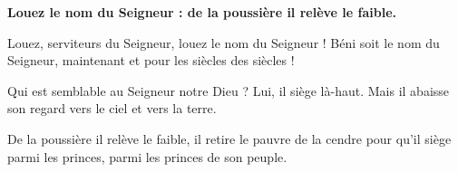 \textbf{Louez le nom du Seigneur :
de la poussière il relève le faible.}

\smallskip

Louez, serviteurs du Seigneur,
louez le nom du Seigneur !
Béni soit le nom du Seigneur,
maintenant et pour les siècles des siècles !

\smallskip

Qui est semblable au Seigneur notre Dieu ?
Lui, il siège là-haut.
Mais il abaisse son regard
vers le ciel et vers la terre.

\smallskip

De la poussière il relève le faible,
il retire le pauvre de la cendre
pour qu’il siège parmi les princes,
parmi les princes de son peuple.
